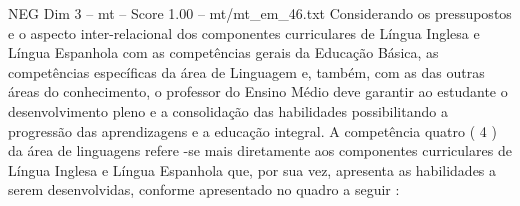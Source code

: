 \begin{textsample}{NEG Dim 3 – mt – Score 1.00 – mt/mt\_em\_46.txt}
Considerando os pressupostos e o aspecto inter-relacional dos componentes curriculares de Língua Inglesa e Língua Espanhola com as competências gerais da Educação Básica, as competências específicas da área de Linguagem e, também, com as das outras áreas do conhecimento, o professor do Ensino Médio deve garantir ao estudante o desenvolvimento pleno e a consolidação das habilidades possibilitando a progressão das aprendizagens e a educação integral.
A competência quatro ( 4 ) da área de linguagens refere -se mais diretamente aos componentes curriculares de Língua Inglesa e Língua Espanhola que, por sua vez, apresenta as habilidades a serem desenvolvidas, conforme apresentado no quadro a seguir :

\end{textsample}
